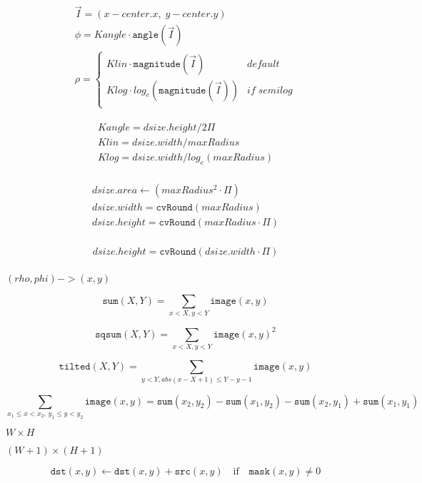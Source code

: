 \documentclass{article}
\begin{document}
\[ \begin{array}{l} \vec{I} = (x - center.x, \;y - center.y) \\ \phi = Kangle \cdot \texttt{angle} (\vec{I}) \\ \rho = \left\{\begin{matrix} Klin \cdot \texttt{magnitude} (\vec{I}) & default \\ Klog \cdot log_e(\texttt{magnitude} (\vec{I})) & if \; semilog \\ \end{matrix}\right. \end{array} \]
\pagebreak

\[ \begin{array}{l} Kangle = dsize.height / 2\Pi \\ Klin = dsize.width / maxRadius \\ Klog = dsize.width / log_e(maxRadius) \\ \end{array} \]
\pagebreak

\[\begin{array}{l} dsize.area \leftarrow (maxRadius^2 \cdot \Pi) \\ dsize.width = \texttt{cvRound}(maxRadius) \\ dsize.height = \texttt{cvRound}(maxRadius \cdot \Pi) \\ \end{array}\]
\pagebreak

\[\begin{array}{l} dsize.height = \texttt{cvRound}(dsize.width \cdot \Pi) \\ \end{array} \]
\pagebreak

$(rho, phi)->(x, y)$
\pagebreak

\[\texttt{sum} (X,Y) = \sum _{x<X,y<Y} \texttt{image} (x,y)\]
\pagebreak

\[\texttt{sqsum} (X,Y) = \sum _{x<X,y<Y} \texttt{image} (x,y)^2\]
\pagebreak

\[\texttt{tilted} (X,Y) = \sum _{y<Y,abs(x-X+1) \leq Y-y-1} \texttt{image} (x,y)\]
\pagebreak

\[\sum _{x_1 \leq x < x_2, \, y_1 \leq y < y_2} \texttt{image} (x,y) = \texttt{sum} (x_2,y_2)- \texttt{sum} (x_1,y_2)- \texttt{sum} (x_2,y_1)+ \texttt{sum} (x_1,y_1)\]
\pagebreak

$W \times H$
\pagebreak

$(W+1)\times (H+1)$
\pagebreak

\[\texttt{dst} (x,y) \leftarrow \texttt{dst} (x,y) + \texttt{src} (x,y) \quad \text{if} \quad \texttt{mask} (x,y) \ne 0\]
\pagebreak
\end{document}
